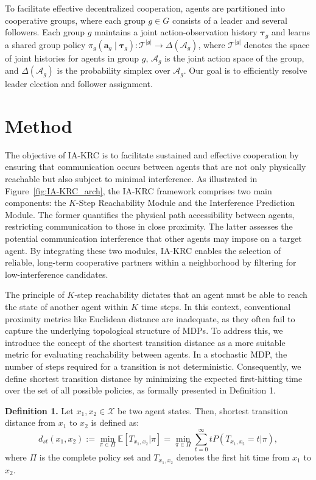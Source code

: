 \documentclass[10pt]{article} %
\begin{document}
To facilitate effective decentralized cooperation, agents are partitioned into cooperative groups, where each group $g \in G$ consists of a leader and several followers. Each group $g$ maintains a joint action-observation history $\boldsymbol{\tau}_g$ and learns a shared group policy $\pi_{g}(\mathbf{a}_g\mid\boldsymbol{\tau}_g)\colon \mathcal{T}^{|g|}\to\Delta(\mathcal{A}_g)$, where $\mathcal{T}^{|g|}$ denotes the space of joint histories for agents in group $g$, $\mathcal{A}_g$ is the joint action space of the group, and $\Delta(\mathcal{A}_g)$ is the probability simplex over $\mathcal{A}_g$. Our goal is to efficiently resolve leader election and follower assignment. 

\section{Method}
The objective of IA-KRC is to facilitate sustained and effective cooperation by ensuring that communication occurs between agents that are not only physically reachable but also subject to minimal interference. As illustrated in Figure~\ref{fig:IA-KRC_arch}, the IA-KRC framework comprises two main components: the $K$-Step Reachability Module and the Interference Prediction Module. The former quantifies the physical path accessibility between agents, restricting communication to those in close proximity. The latter assesses the potential communication interference that other agents may impose on a target agent. By integrating these two modules, IA-KRC enables the selection of reliable, long-term cooperative partners within a neighborhood by filtering for low-interference candidates.

The principle of $K$‑step reachability dictates that an agent must be able to reach the state of another agent within \(K\) time steps. In this context, conventional proximity metrics like Euclidean distance are inadequate, as they often fail to capture the underlying topological structure of MDPs. To address this, we introduce the concept of the shortest transition distance as a more suitable metric for evaluating reachability between agents. In a stochastic MDP, the number of steps required for a transition is not deterministic. Consequently, we define shortest transition distance by minimizing the expected first-hitting time over the set of all possible policies, as formally presented in Definition 1.

\textbf{Definition 1.} Let \(x_1, x_2 \in \mathcal{X}\) be two agent states. Then, shortest transition distance from \(x_1\) to \(x_2\) is defined as:
\[
d_{st}(x_1, x_2) := \min_{\pi \in \Pi} \mathbb{E}[T_{x_1, x_2} | \pi] = \min_{\pi \in \Pi} \sum_{t=0}^{\infty} t P(T_{x_1, x_2} = t | \pi),
\]
where \(\Pi\) is the complete policy set and \(T_{x_1, x_2}\) denotes the first hit time from \(x_1\) to \(x_2\).
\end{document}
